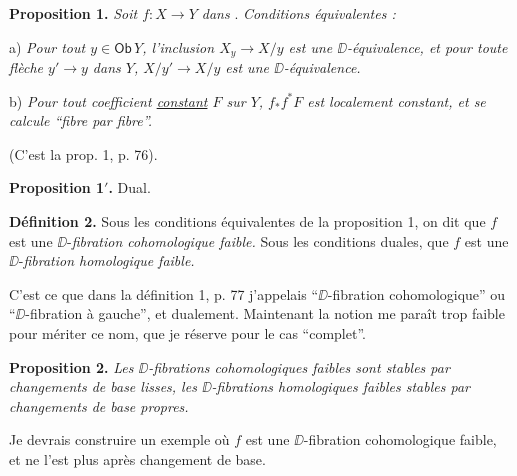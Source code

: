 \textbf{Proposition 1.} \textit{Soit $f : X \to Y$ dans} \Dia. \textit{Conditions équivalentes :}

a) \textit{Pour tout $y \in \mathsf{Ob}\, Y$, l'inclusion $X_y \to X/y$ est une $\DD$-équivalence, et pour toute flèche $y' \to y$ dans $Y$, $X/y' \to X/y$ est une $\DD$-équivalence.}

b) \textit{Pour tout coefficient \underline{constant} $F$ sur $Y$, $f_{*}f^{*}F$ est localement constant, et se calcule “fibre par fibre”.}

(C'est la prop. 1, p. 76).

\textbf{Proposition 1$'$.} Dual.


\textbf{Définition 2.} Sous les conditions équivalentes de la proposition 1, on dit que $f$ est une $\DD$-\textit{fibration cohomologique faible.} Sous les conditions duales, que $f$ est une $\DD$-\textit{fibration homologique faible.}

C'est ce que dans la définition 1, p. 77 j'appelais “$\DD$-fibration cohomologique” ou “$\DD$-fibration à gauche”, et dualement. Maintenant la notion me paraît trop faible pour mériter ce nom, que je réserve pour le cas “complet”.

\textbf{Proposition 2.} \textit{Les $\DD$-fibrations cohomologiques faibles sont stables par changements de base lisses, les $\DD$-fibrations homologiques faibles stables par changements de base propres.}

Je devrais construire un exemple où $f$ est une $\DD$-fibration cohomologique faible, et ne l'est plus après changement de base.

